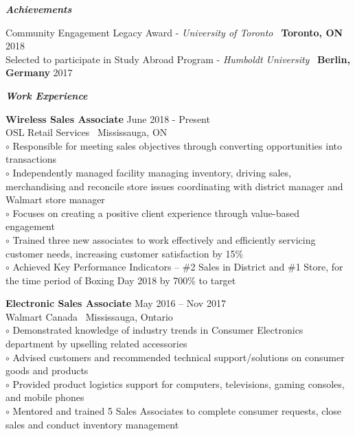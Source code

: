 \documentclass{article}
\begin{document}
\bigskip

\begin{center}
    \large  \textcolor{ablue}{\textit{\textbf{Achievements}}}
   \end{center}
   
\indent Community Engagement Legacy Award - \textit{University of Toronto} \textbar  \ \textbf{Toronto, ON}
\hfill 2018
\\\indent Selected to participate in Study Abroad Program - \textit{Humboldt University} \textbar \  \textbf{Berlin, Germany}
\hfill 2017


\newpage

\begin{center}
  \large  \textcolor{ablue}{\textit{\textbf{Work Experience}}}
\end{center}


\noindent \textbf{Wireless Sales Associate}                                                          
\hfill June 2018 - Present 
\\ \noindent OSL Retail Services  \textbar \  Mississauga, ON                  
\\ $\circ$ Responsible for meeting sales objectives through converting opportunities into transactions
\\ $\circ$ Independently managed facility managing inventory, driving sales, merchandising and reconcile store issues  coordinating with district manager and Walmart store manager 
\\ $\circ$ Focuses on creating a positive client experience through value-based engagement
\\ $\circ$ Trained three new associates to work effectively and efficiently servicing customer needs, increasing customer satisfaction by 15\%
\\ $\circ$ Achieved Key Performance Indicators – \#2 Sales in District and  \#1 Store, for the time period of Boxing Day 2018 by 700\% to target

\bigskip


\noindent \textbf{Electronic Sales Associate}                                                                
\hfill May 2016 – Nov 2017 
\\ \noindent Walmart Canada  \textbar \  Mississauga, Ontario                 
\\ $\circ$ Demonstrated knowledge of industry trends in Consumer Electronics department by upselling  related accessories
\\ $\circ$ Advised customers and recommended technical support/solutions on consumer goods and products
\\ $\circ$ Provided product logistics support for computers, televisions, gaming consoles, and mobile phones 
\\ $\circ$ Mentored and trained 5 Sales Associates to complete consumer requests, close sales and conduct inventory management 
\end{document}
